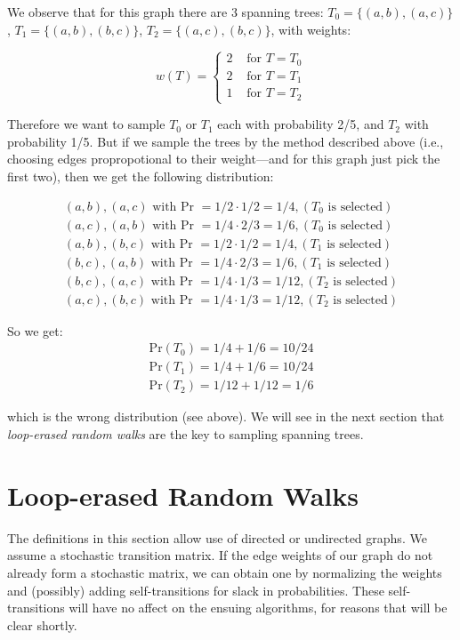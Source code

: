 \documentclass[11pt]{article}
\begin{document}
We observe that for this graph there are 3 spanning trees:
$T_0 = \{(a,b), (a,c)\}$,
$T_1 = \{(a,b), (b,c)\}$,
$T_2 = \{(a,c), (b,c)\}$, with weights:

\[w(T) = \begin{cases}
        2 & \text{ for } T = T_0\\
        2 & \text{ for } T = T_1\\
        1 & \text{ for } T = T_2
        \end{cases}\]

Therefore we want to sample $T_0$ or $T_1$ each with probability 2/5, and $T_2$
with probability 1/5. But if we sample the trees by the method described above
(i.e., choosing edges propropotional to their weight---and for this graph just
pick the first two), then we get the following distribution:

\begin{align*}
(a,b), (a,c)\text{ with Pr }= 1/2 \cdot 1/2 = 1/4, (T_0 \text{ is selected})\\
(a,c), (a,b)\text{ with Pr }= 1/4 \cdot 2/3 = 1/6, (T_0 \text{ is selected})\\
(a,b), (b,c)\text{ with Pr }= 1/2 \cdot 1/2 = 1/4, (T_1 \text{ is selected})\\
(b,c), (a,b)\text{ with Pr }= 1/4 \cdot 2/3 = 1/6, (T_1 \text{ is selected})\\
(b,c), (a,c)\text{ with Pr }= 1/4 \cdot 1/3 = 1/12, (T_2 \text{ is selected})\\
(a,c), (b,c)\text{ with Pr }= 1/4 \cdot 1/3 = 1/12, (T_2 \text{ is selected})
\end{align*}

So we get:
\begin{align*}
\text{Pr}(T_0) = 1/4 + 1/6 = 10/24\\
\text{Pr}(T_1) = 1/4 + 1/6 = 10/24\\
\text{Pr}(T_2) = 1/12 + 1/12 = 1/6
\end{align*}

which is the wrong distribution (see above). We will see in the next section that
\emph{loop-erased random walks} are the key to sampling spanning trees.

\section{Loop-erased Random Walks}

The definitions in this section allow use of directed or undirected graphs. We
assume a stochastic transition matrix. If the edge weights of our graph do not
already form a stochastic matrix, we can obtain one by normalizing the weights
and (possibly) adding self-transitions for slack in probabilities. These
self-transitions will have no affect on the ensuing algorithms, for reasons that
will be clear shortly.
\end{document}
